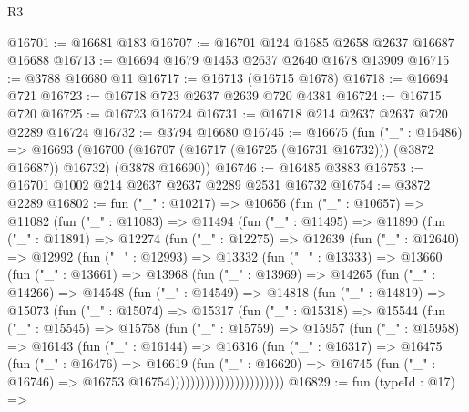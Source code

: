 \begin{lexlean}{R3}
\begin{coremodule}
@16701 := @16681 @183
@16707 := @16701 @124 @1685 @2658 @2637 @16687 @16688
@16713 := @16694 @1679 @1453 @2637 @2640 @1678 @13909
@16715 := @3788 @16680 @11
@16717 := @16713 (@16715 @1678)
@16718 := @16694 @721
@16723 := @16718 @723 @2637 @2639 @720 @4381
@16724 := @16715 @720
@16725 := @16723 @16724
@16731 := @16718 @214 @2637 @2637 @720 @2289 @16724
@16732 := @3794 @16680
@16745 := @16675
    (fun ("_" : @16486) =>
    @16693 (@16700 (@16707 (@16717 (@16725 (@16731 @16732))) (@3872 @16687)) @16732) (@3878 @16690))
@16746 := @16485 @3883
@16753 := @16701 @1002 @214 @2637 @2637 @2289 @2531 @16732
@16754 := @3872 @2289
@16802 := fun ("_" : @10217) =>
  @10656
    (fun ("_" : @10657) =>
    @11082
      (fun ("_" : @11083) =>
      @11494
        (fun ("_" : @11495) =>
        @11890
          (fun ("_" : @11891) =>
          @12274
            (fun ("_" : @12275) =>
            @12639
              (fun ("_" : @12640) =>
              @12992
                (fun ("_" : @12993) =>
                @13332
                  (fun ("_" : @13333) =>
                  @13660
                    (fun ("_" : @13661) =>
                    @13968
                      (fun ("_" : @13969) =>
                      @14265
                        (fun ("_" : @14266) =>
                        @14548
                          (fun ("_" : @14549) =>
                          @14818
                            (fun ("_" : @14819) =>
                            @15073
                              (fun ("_" : @15074) =>
                              @15317
                                (fun ("_" : @15318) =>
                                @15544
                                  (fun ("_" : @15545) =>
                                  @15758
                                    (fun ("_" : @15759) =>
                                    @15957
                                      (fun ("_" : @15958) =>
                                      @16143
                                        (fun ("_" : @16144) =>
                                        @16316
                                          (fun ("_" : @16317) =>
                                          @16475
                                            (fun ("_" : @16476) =>
                                            @16619
                                              (fun ("_" : @16620) =>
                                              @16745
                                                (fun ("_" : @16746) =>
                                                @16753 @16754)))))))))))))))))))))))
@16829 := fun (typeId : @17) =>

\end{coremodule}
\end{lexlean}
